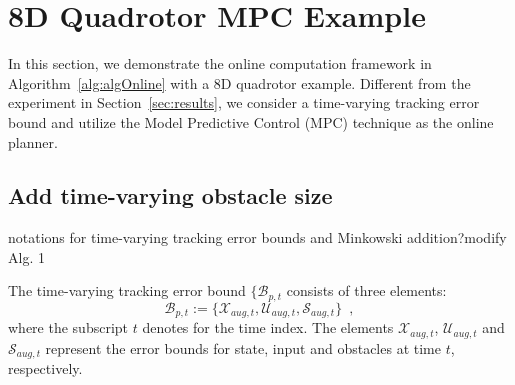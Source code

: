 \section{8D Quadrotor MPC Example \label{sec:results}}
%
In this section, we demonstrate the online computation framework in Algorithm~\ref{alg:algOnline} with a 8D quadrotor example. Different from the experiment in Section~\ref{sec:results}, we consider a time-varying tracking error bound and utilize the Model Predictive Control (MPC) technique as the online planner. 
%
\subsection{Add time-varying obstacle size}
\color{blue} notations for time-varying tracking error bounds and Minkowski addition?modify Alg. 1\color{black}

The time-varying tracking error bound $\{\mathcal{B}_{p,t}$ consists of three elements:
\begin{equation}
\mathcal{B}_{p,t} :=\{\mathcal{X}_{aug,t}, \mathcal{U}_{aug,t}, \mathcal{S}_{aug,t}\}\enspace ,
\end{equation}
where the subscript $t$ denotes for the time index. The elements $\mathcal{X}_{aug,t}$,  $\mathcal{U}_{aug,t}$ and  $\mathcal{S}_{aug,t}$ represent the error bounds for state, input and obstacles at time $t$, respectively.
%

